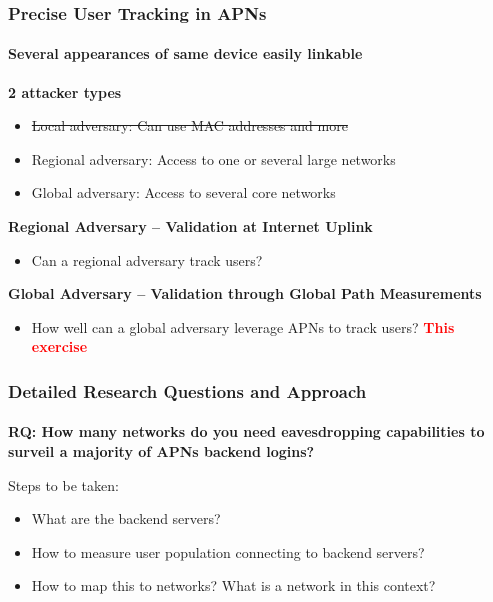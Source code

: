\begin{frame}
\frametitle{Precise User Tracking in APNs}
\framesubtitle{Several appearances of same device easily linkable}

\textbf{2 attacker types}\\
\begin{itemize}
\item \st{Local adversary: Can use MAC addresses and more}
\item Regional adversary: Access to one or several large networks 
\item Global adversary: Access to several core networks
\end{itemize}

\textbf{Regional Adversary -- Validation at Internet Uplink}\\
\begin{itemize}
\item Can a regional adversary track users?  \textcolor{TUMGreen}{\checkmark}
\end{itemize}

\textbf{Global Adversary -- Validation through Global Path Measurements}\\
\begin{itemize}
	\item How well can a global adversary leverage APNs to track users? \textcolor{red}{\textbf{This exercise}}
\end{itemize}

\end{frame}
\clearpage


\begin{frame}
\frametitle{Detailed Research Questions and Approach}
\framesubtitle{}

\textbf{RQ: How many networks do you need eavesdropping capabilities to surveil a majority of APNs backend logins?}

Steps to be taken:
\begin{itemize}
	\item What are the backend servers?
	\item How to measure user population connecting to backend servers?
	\item How to map this to networks? What is a network in this context?
\end{itemize}
\end{frame}
\clearpage

